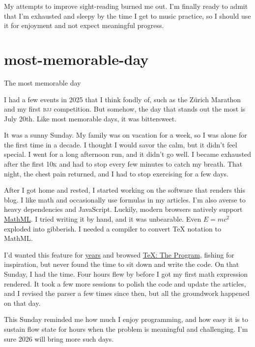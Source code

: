 \documentclass{article}
\begin{document}
My attempts to improve sight-reading burned me out.
I'm finally ready to admit
that I'm exhausted and sleepy by the time I get to music practice,
so I should use it for enjoyment and not expect meaningful progress.

\section{most-memorable-day}{The most memorable day}

I had a few events in 2025 that I think fondly of,
such as the Zürich Marathon and my first \textsc{bjj} competition.
But somehow, the day that stands out the most is July 20th.
Like most memorable days, it was bittersweet.

It was a sunny Sunday.
My family was on vacation for a week,
so I was alone for the first time in a decade.
I thought I would savor the calm,
but it didn't feel special.
I went for a long afternoon run,
and it didn't go well.
I became exhausted after the first \textsc{10k}
and had to stop every few minutes to catch my breath.
That night, the chest pain returned,
and I had to stop exercising for a few days.

After I got home and rested,
I started working on the software that renders this blog.
I like math and occasionally use formulas in my articles.
I'm also averse to heavy dependencies and JavaScript.
Luckily, modern browsers natively support \href{https://w3c.github.io/mathml-core/}{MathML}.
I tried writing it by hand,
and it was unbearable.
Even $E = mc^2$ exploded into gibberish.
I needed a compiler to convert TeX notation to MathML.

I'd wanted this feature for \href{https://github.com/roman-kashitsyn/mmapped.blog/issues/61}{years}
and browsed \href{https://tug.ctan.org/info/knuth-pdf/tex/tex.pdf}{TeX: The Program}, fishing for inspiration,
but never found the time to sit down and write the code.
On that Sunday, I had the time.
Four hours flew by before I got my first math expression rendered.
It took a few more sessions to polish the code and update the articles,
and I revised the parser a few times since then,
but all the groundwork happened on that day.

This Sunday reminded me how much I enjoy programming,
and how easy it is to sustain flow state for hours
when the problem is meaningful and challenging.
I'm sure 2026 will bring more such days.
\end{document}
